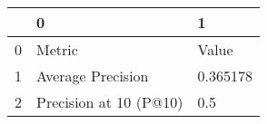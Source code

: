 \begin{tabular}{lll}
\toprule
{} &                       0 &         1 \\
\midrule
0 &                  Metric &     Value \\
1 &       Average Precision &  0.365178 \\
2 &  Precision at 10 (P@10) &       0.5 \\
\bottomrule
\end{tabular}
